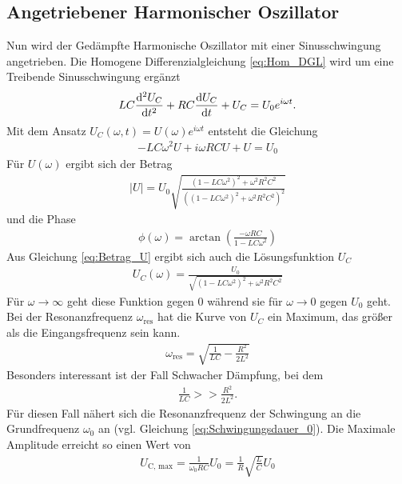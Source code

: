 \subsection{Angetriebener Harmonischer Oszillator}
Nun wird der Gedämpfte Harmonische Oszillator mit einer Sinusschwingung angetrieben.
Die Homogene Differenzialgleichung \ref{eq:Hom_DGL} wird um eine Treibende Sinusschwingung ergänzt
\begin{align}
    LC \frac{\mathop{}\!\mathrm{d}^2 U_C}{\mathop{}\!\mathrm{d} t^2}+ RC \frac{\mathop{}\!\mathrm{d} U_C}{\mathop{}\!\mathrm{d} t} + U_C = U_0 e^{i \omega t} .
    \label{eq:inhom_DGL}
\end{align}
Mit dem Ansatz $U_C(\omega, t) = U(\omega) e^{i \omega t}$ entsteht die Gleichung
\begin{align*}
    -LC \omega^2 U + i \omega RC U + U = U_0
\end{align*}
Für $U(\omega)$ ergibt sich der Betrag
\begin{align}
    \mid U \mid = U_0 \sqrt{\frac{\left(1-LC \omega^2 \right)^2+ \omega^2 R^2 C^2}{\left(\left(1-LC \omega^2 \right)^2 + \omega^2 R^2 C^2\right)^2 }}
    \label{eq:Betrag_U}
\end{align}
und die Phase 
\begin{align}
    \phi(\omega) = \arctan\left(\frac{-\omega RC}{1-LC \omega^2}\right)
    \label{eq:Phi_omega}
\end{align}
Aus Gleichung \ref{eq:Betrag_U} ergibt sich auch die Lösungsfunktion $U_C$
\begin{align}
    U_C(\omega) = \frac{U_0}{\sqrt{\left(1-LC \omega^2 \right)^2+ \omega^2 R^2 C^2}}
    \label{eq:U_c_omega}
\end{align}
Für $\omega \rightarrow \infty$ geht diese Funktion gegen 0 während sie für $\omega \rightarrow 0$ gegen $U_0$ geht.
Bei der Resonanzfrequenz $\omega_\text{res}$ hat die Kurve von $U_C$ ein Maximum, das größer als die Eingangsfrequenz sein kann. 
\begin{align}
    \omega_\text{res} = \sqrt{\frac{1}{LC}- \frac{R^2}{2L^2}}
    \label{eq:Resonanzfrequenz}
\end{align}
Besonders interessant ist der Fall Schwacher Dämpfung, bei dem 
\begin{align*}
    \frac{1}{LC} >> \frac{R^2}{2L^2}.
\end{align*}
Für diesen Fall nähert sich die Resonanzfrequenz der Schwingung an die Grundfrequenz $\omega_0$ an (vgl. Gleichung \eqref{eq:Schwingungsdauer_0}).
Die Maximale Amplitude erreicht so einen Wert von
\begin{align}
    U_\text{C, max} = \frac{1}{\omega_0 RC}U_0 = \frac{1}{R}\sqrt{\frac{L}{C}}U_0
    \label{eq:UC_max}
\end{align}
